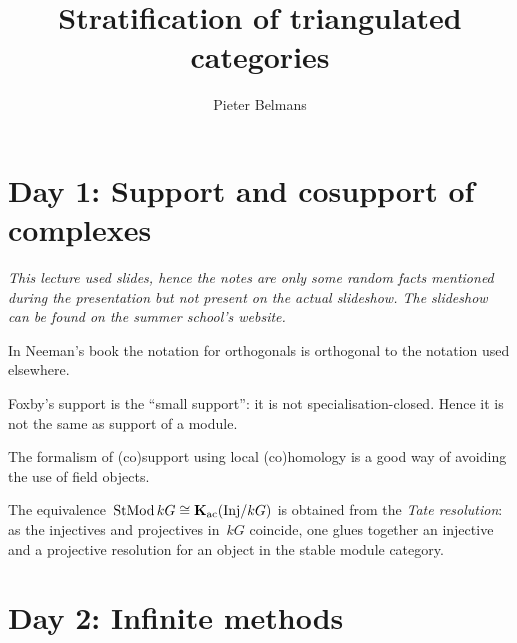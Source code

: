 \documentclass[10pt,a4paper]{article}
\title{Stratification of triangulated categories}
\author{Pieter Belmans}
\begin{document}
\maketitle

\tableofcontents

\clearpage

\section{Day 1: Support and cosupport of complexes}
\emph{This lecture used slides, hence the notes are only some random facts mentioned during the presentation but not present on the actual slideshow. The slideshow can be found on the summer school's website.}

\begin{remark}
  In Neeman's book the notation for orthogonals is orthogonal to the notation used elsewhere.
\end{remark}
\begin{remark}
  Foxby's support is the ``small support'': it is not specialisation-closed. Hence it is not the same as support of a module.
\end{remark}
\begin{remark}
  The formalism of (co)support using local (co)homology is a good way of avoiding the use of field objects.
\end{remark}
\begin{remark}
  The equivalence~$\operatorname{StMod} kG\cong\operatorname{\mathbf{K}}_{\mathrm{ac}}(\mathrm{Inj}/kG)$ is obtained from the \emph{Tate resolution}: as the injectives and projectives in~$kG$ coincide, one glues together an injective and a projective resolution for an object in the stable module category.
\end{remark}


\section{Day 2: Infinite methods}
\end{document}
